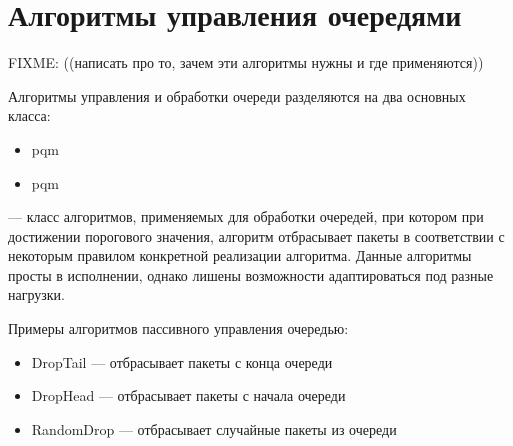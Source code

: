 \section{Алгоритмы управления очередями}
\label{chap1:sec2}

FIXME: ((написать про то, зачем эти алгоритмы нужны и где применяются))

Алгоритмы управления и обработки очереди разделяются на два основных класса:

\begin{itemize}
  \item \acf{pqm}
  \item \acf{pqm}
\end{itemize}

 --- класс алгоритмов, применяемых для обработки очередей, при котором при достижении порогового значения, алгоритм отбрасывает пакеты в соответствии с некоторым правилом конкретной реализации алгоритма. Данные алгоритмы просты в исполнении, однако лишены возможности адаптироваться под разные нагрузки. 

Примеры алгоритмов пассивного управления очередью:

\begin{itemize}
  \item DropTail --- отбрасывает пакеты с конца очереди
  \item DropHead --- отбрасывает пакеты с начала очереди 
  \item RandomDrop --- отбрасывает случайные пакеты из очереди 
\end{itemize}













